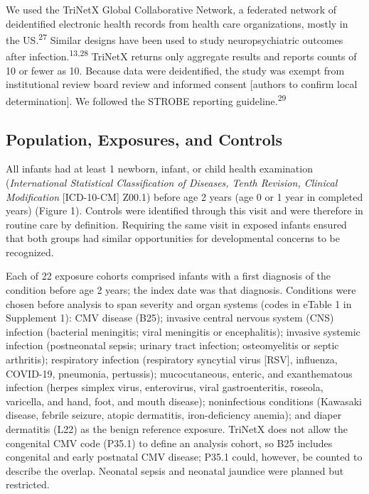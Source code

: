 \documentclass[11pt]{article}
\begin{document}
We used the TriNetX Global Collaborative Network, a federated network of deidentified electronic health records from health care organizations, mostly in the US.\textsuperscript{27} Similar designs
have been used to study neuropsychiatric outcomes after infection.\textsuperscript{13,28} TriNetX returns only aggregate results and reports counts of 10 or fewer as 10. Because data were
deidentified, the study was exempt from institutional review board review and informed consent {[}authors to confirm local determination{]}. We followed the STROBE reporting
guideline.\textsuperscript{29}

\hypertarget{population-exposures-and-controls}{%
\subsection*{Population, Exposures, and Controls}\label{population-exposures-and-controls}}

All infants had at least 1 newborn, infant, or child health examination (\emph{International Statistical Classification of Diseases, Tenth Revision, Clinical Modification} {[}ICD-10-CM{]} Z00.1)
before age 2 years (age 0 or 1 year in completed years) (Figure 1). Controls were identified through this visit and were therefore in routine care by definition. Requiring the same visit in exposed
infants ensured that both groups had similar opportunities for developmental concerns to be recognized.

Each of 22 exposure cohorts comprised infants with a first diagnosis of the condition before age 2 years; the index date was that diagnosis. Conditions were chosen before analysis to span severity and
organ systems (codes in eTable 1 in Supplement 1): CMV disease (B25); invasive central nervous system (CNS) infection (bacterial meningitis; viral meningitis or encephalitis); invasive systemic
infection (postneonatal sepsis; urinary tract infection; osteomyelitis or septic arthritis); respiratory infection (respiratory syncytial virus {[}RSV{]}, influenza, COVID-19, pneumonia, pertussis);
mucocutaneous, enteric, and exanthematous infection (herpes simplex virus, enterovirus, viral gastroenteritis, roseola, varicella, and hand, foot, and mouth disease); noninfectious conditions
(Kawasaki disease, febrile seizure, atopic dermatitis, iron-deficiency anemia); and diaper dermatitis (L22) as the benign reference exposure. TriNetX does not allow the congenital CMV code (P35.1) to
define an analysis cohort, so B25 includes congenital and early postnatal CMV disease; P35.1 could, however, be counted to describe the overlap. Neonatal sepsis and neonatal jaundice were planned but
restricted.
\end{document}
